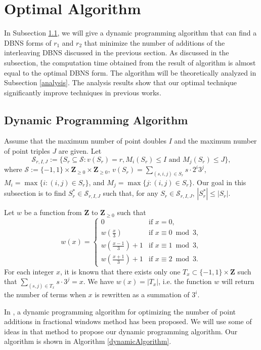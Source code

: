 \section{Optimal Algorithm}

In Subsection \ref{dynamic}, we will give a dynamic programming algorithm that can find a DBNS forms of $r_1$ and $r_2$ that minimize the number of additions of the interleaving DBNS discussed in the previous section. As discussed in the subsection, the computation time obtained from the result of algorithm is almost equal to the optimal DBNS form. The algorithm will be theoretically analyzed in Subsection \ref{analysis}. The analysis results show that our optimal technique significantly improve techniques in previous works.

\subsection{Dynamic Programming Algorithm}
\label{dynamic}

Assume that the maximum number of point doubles $I$ and the maximum number of point triples $J$ are given. Let 
$$\mathcal{S}_{r, I, J} := \{S_r \subseteq \mathcal{S} : v(S_r) = r, M_i (S_r) \leq I \text{ and } M_j (S_r) \leq J \},$$
where $\mathcal{S} := \{-1, 1\} \times \mathbf{Z}_{\geq 0} \times \mathbf{Z}_{\geq 0}$, $v(S_r) = \sum\limits_{(s,i,j) \in S_r} s\cdot 2^i 3^j$, $M_i = \max \{i : (i,j) \in S_r\}$, and $M_j = \max \{j : (i,j) \in S_r\}$.
Our goal in this subsection is to find $S_r^* \in \mathcal{S}_{r, I, J}$ such that, for any $S_r \in \mathcal{S}_{r, I, J}$, $\left| S_r^* \right| \leq \left| S_r \right|$.

Let $w$ be a function from $\mathbf{Z}$ to $\mathbf{Z}_{\geq 0}$ such that
\[
w(x) =
\begin{cases}
0 & \text{if } x = 0, \\
w\left(\frac{x}{3}\right) & \text{if } x \equiv 0 \bmod 3,\\
w \left(\frac{x - 1}{3} \right) + 1 & \text{if } x \equiv 1 \bmod 3,\\
w \left(\frac{x + 1}{3} \right) + 1 & \text{if } x \equiv 2 \bmod 3.
\end{cases}
\]
For each integer $x$, it is known that there exists only one $T_x \subset \{-1,1\} \times \mathbf{Z}$ such that $\sum\limits_{(s,j) \in T_x} s \cdot 3^j = x$. We have $w(x) = |T_x|$, i.e. the function $w$ will return the number of terms when $x$ is rewritten as a summation of $3^i$.

In \cite{analysisMethod}, a dynamic programming algorithm for optimizing the number of point additions in fractional windows method has been proposed. We will use some of ideas in that method to propose our dynamic programming algorithm. Our algorithm is shown in Algorithm \ref{dynamicAlgorithm}.

